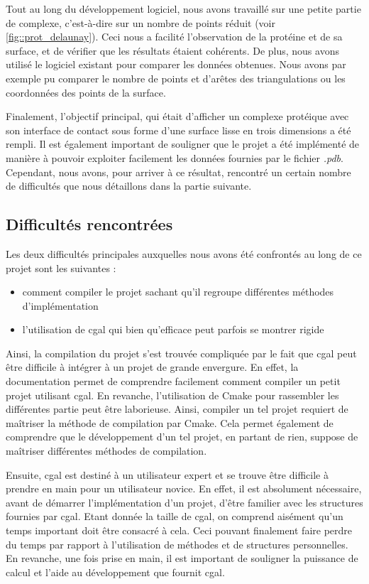 Tout au long du développement logiciel, nous avons travaillé sur une petite partie de
complexe, c'est-à-dire sur un nombre de points réduit (voir \ref{fig::prot_delaunay}).
Ceci nous a facilité l'observation de la protéine et de sa surface, et de vérifier
que les résultats étaient cohérents.
De plus, nous avons utilisé le logiciel existant pour comparer les données obtenues.
Nous avons par exemple pu comparer le nombre de points et d'arêtes des triangulations ou
les coordonnées des points de la surface.

Finalement, l'objectif principal, qui était d'afficher un complexe protéique avec son
interface de contact sous forme d'une surface lisse en trois dimensions a été rempli.
Il est également important de souligner que le projet a été implémenté de manière à
pouvoir exploiter facilement les données fournies par le fichier \textit{.pdb}.
Cependant, nous avons, pour arriver à ce résultat, rencontré un certain nombre de difficultés que nous
détaillons dans la partie suivante.


\subsection*{Difficultés rencontrées}
Les deux difficultés principales auxquelles nous avons été confrontés au long de ce projet
sont les suivantes :
\begin{itemize}
  \item comment compiler le projet sachant qu'il regroupe différentes méthodes d'implémentation
  \item l'utilisation de \gls{cgal} qui bien qu'efficace peut parfois se montrer rigide
\end{itemize}

Ainsi, la compilation du projet s'est trouvée compliquée par le fait que \gls{cgal} peut être difficile
à intégrer à un projet de grande envergure. En effet, la documentation permet de
comprendre facilement comment compiler un petit projet utilisant \gls{cgal}. En revanche, l'utilisation de Cmake
pour rassembler les différentes partie peut être laborieuse. Ainsi, compiler un tel projet
requiert de maîtriser la méthode de compilation par Cmake. Cela permet également de comprendre
que le développement d'un tel projet, en partant de rien, suppose de maîtriser différentes
méthodes de compilation.

Ensuite, \gls{cgal} est destiné à un utilisateur expert et se trouve être difficile à prendre
en main pour un utilisateur novice. En effet, il est absolument nécessaire, avant de
démarrer l'implémentation d'un projet, d'être familier avec les structures fournies par \gls{cgal}.
Etant donnée la taille de \gls{cgal}, on comprend aisément qu'un temps important doit être
consacré à cela. Ceci pouvant finalement faire perdre du temps par rapport à l'utilisation de méthodes
et de structures personnelles. En revanche, une fois prise en main, il est important de souligner la puissance
de calcul et l'aide au développement que fournit \gls{cgal}.

